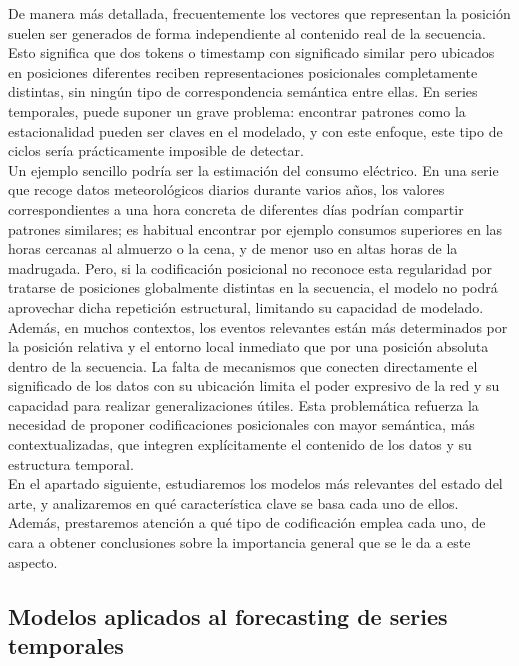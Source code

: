 De manera más detallada, frecuentemente los vectores que representan la posición suelen ser generados de forma independiente al contenido real de la secuencia. Esto significa que dos tokens o timestamp con significado similar pero ubicados en posiciones diferentes reciben representaciones posicionales completamente distintas, sin ningún tipo de correspondencia semántica entre ellas. En series temporales, puede suponer un grave problema: encontrar patrones como la estacionalidad pueden ser claves en el modelado, y con este enfoque, este tipo de ciclos sería prácticamente imposible de detectar.\\

Un ejemplo sencillo podría ser la estimación del consumo eléctrico. En una serie que recoge datos meteorológicos diarios durante varios años, los valores correspondientes a una hora concreta de diferentes días podrían compartir patrones similares; es habitual encontrar por ejemplo consumos superiores en las horas cercanas al almuerzo o la cena, y de menor uso en altas horas de la madrugada. Pero, si la codificación posicional no reconoce esta regularidad por tratarse de posiciones globalmente distintas en la secuencia, el modelo no podrá aprovechar dicha repetición estructural, limitando su capacidad de modelado.\\

Además, en muchos contextos, los eventos relevantes están más determinados por la posición relativa y el entorno local inmediato que por una posición absoluta dentro de la secuencia. La falta de mecanismos que conecten directamente el significado de los datos con su ubicación limita el poder expresivo de la red y su capacidad para realizar generalizaciones útiles. Esta problemática refuerza la necesidad de proponer codificaciones posicionales con mayor semántica, más contextualizadas, que integren explícitamente el contenido de los datos y su estructura temporal.\\

En el apartado siguiente, estudiaremos los modelos más relevantes del estado del arte, y analizaremos en qué característica clave se basa cada uno de ellos. Además, prestaremos atención a qué tipo de codificación emplea cada uno, de cara a obtener conclusiones sobre la importancia general que se le da a este aspecto.

\subsection{Modelos aplicados al forecasting de series temporales}

